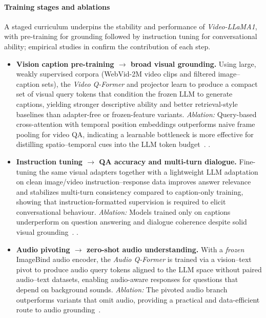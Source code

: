 \begin{enrichment}
\begin{enrichment}
        \paragraph{Training stages and ablations}
        A staged curriculum underpins the stability and performance of \emph{Video\mbox{-}LLaMA1}, with pre-training for grounding followed by instruction tuning for conversational ability; empirical studies in \cite[Sec.~2.1--2.3, 4]{zhang2023_videollama} confirm the contribution of each step.
        \begin{itemize}
            \item \textbf{Vision caption pre-training $\rightarrow$ broad visual grounding.} Using large, weakly supervised corpora (WebVid-2M video clips and filtered image–caption sets), the \emph{Video Q-Former} and projector learn to produce a compact set of visual query tokens that condition the frozen LLM to generate captions, yielding stronger descriptive ability and better retrieval-style baselines than adapter-free or frozen-feature variants. \emph{Ablation:} Query-based cross-attention with temporal position embeddings outperforms naive frame pooling for video QA, indicating a learnable bottleneck is more effective for distilling spatio–temporal cues into the LLM token budget~\cite[Sec.~2.1, 4]{zhang2023_videollama}.
            .\item \textbf{Instruction tuning $\rightarrow$ QA accuracy and multi-turn dialogue.} Fine-tuning the same visual adapters together with a lightweight LLM adaptation on clean image/video instruction–response data improves answer relevance and stabilizes multi-turn consistency compared to caption-only training, showing that instruction-formatted supervision is required to elicit conversational behaviour. \emph{Ablation:} Models trained only on captions underperform on question answering and dialogue coherence despite solid visual grounding~\cite[Sec.~2.3, 4]{zhang2023_videollama}.
            .\item \textbf{Audio pivoting $\rightarrow$ zero-shot audio understanding.} With a \emph{frozen} ImageBind audio encoder, the \emph{Audio Q-Former} is trained via a vision–text pivot to produce audio query tokens aligned to the LLM space without paired audio–text datasets, enabling audio-aware responses for questions that depend on background sounds. \emph{Ablation:} The pivoted audio branch outperforms variants that omit audio, providing a practical and data-efficient route to audio grounding~\cite[Sec.~2.2, 4]{zhang2023_videollama}.
        \end{itemize}
        

\end{enrichment}
\end{enrichment}
